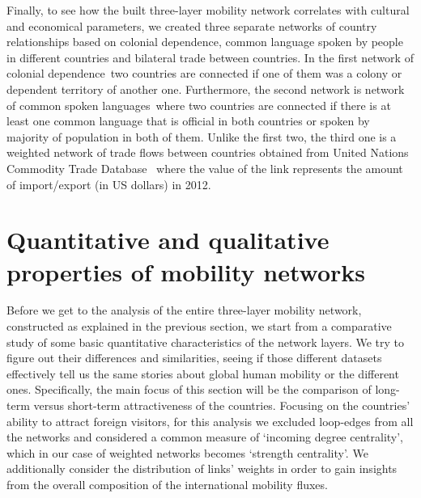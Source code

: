 \documentclass[aps,superscriptaddress,showkeys,nofootinbib]{revtex4-1}
\begin{document}
Finally, to see how the built three-layer mobility network correlates with cultural and economical parameters, we created three separate networks of country relationships based on colonial dependence, common language spoken by people in different countries and bilateral trade between countries. In the first network of colonial dependence\,\cite{hensel2009icow} two countries are connected if one of them was a colony or dependent territory of another one. Furthermore, the second network is network of common spoken languages\,\cite{Languages} where two countries are connected if there is at least one common language that is official in both countries or spoken by majority of population in both of them. Unlike the first two, the third one is a weighted network of trade flows between countries obtained from United Nations Commodity Trade Database~\cite{UNCOMTRADE} where the value of the link represents the amount of import/export (in US dollars) in 2012.

\section{Quantitative and qualitative properties of mobility networks}
\label{sec:analysis}

Before we get to the analysis of the entire three-layer mobility network, constructed as explained in the previous section, we start from a comparative study of some basic quantitative characteristics of the network layers. We try to figure out their differences and similarities, seeing if those different datasets effectively tell us the same stories about global human mobility or the different ones. Specifically, the main focus of this section will be the comparison of long-term versus short-term attractiveness of the countries. Focusing on the countries' ability to attract foreign visitors, for this analysis we excluded loop-edges from all the networks and considered a common measure of `incoming degree centrality', which in our case of weighted networks becomes `strength centrality'. We additionally consider the distribution of links' weights in order to gain insights from the overall composition of the international mobility fluxes.
\end{document}
